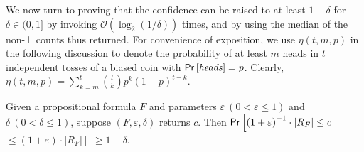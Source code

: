 We now turn to proving that the confidence can be raised to at least
$1-\delta$ for $\delta \in (0, 1]$ by invoking {\ApproxMCCore}
$\mathcal{O}(\log_2(1/\delta))$ times, and by using the median of the
non-$\bot$ counts thus returned.  For convenience of exposition, we
use $\eta(t, m, p)$ in the following discussion to denote the
probability of at least $m$ heads in $t$ independent tosses of a
biased coin with $\mathsf{Pr}\left[\mathit{heads}\right] = p$.  Clearly, 
$\eta(t, m, p) = \sum_{k=m}^{t} \binom{t}{k} p^{k} (1-p)^{t-k}$.
%
%
%
%
%
%
%
%
%
%
%
%
%
%
%
%
%

%
%
%
%
%
%
%
%
%
%
%
%
%
%
%
%
%
%

\begin{theorem} \label{theorem:approx}
Given a propositional formula $F$ and parameters $\varepsilon ~(0 <
\varepsilon \le 1)$ and $\delta ~(0 < \delta \le
1)$, suppose {\ApproxMC}$(F, \varepsilon, \delta)$ returns $c$.  Then
$\mathsf{Pr}\left[{\left(1+\varepsilon\right)}^{-1}\cdot |R_F| \le c \right.$ $\left.\le
  (1+\varepsilon)\cdot |R_F|\right]$ $\ge 1-\delta$.
%
%
\end{theorem}
